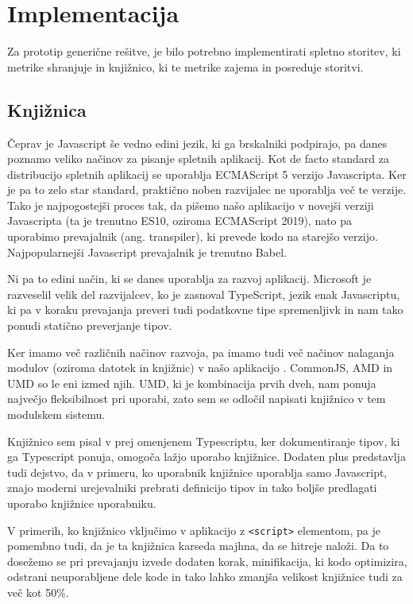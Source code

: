 \documentclass[a4paper, 12pt]{book}
\begin{document}
\section{Implementacija}
\label{ch3:sec2}

Za prototip generične rešitve, je bilo potrebno implementirati spletno storitev, ki metrike shranjuje in knjižnico, ki te metrike zajema in posreduje storitvi.

\subsection{Knjižnica}
\label{ch3:sec2:sub1}

Čeprav je Javascript še vedno edini jezik, ki ga brskalniki podpirajo, pa danes poznamo veliko načinov za pisanje spletnih aplikacij. Kot de facto standard za distribucijo spletnih aplikacij se uporablja ECMAScript 5 verzijo Javascripta. Ker je pa to zelo star standard, praktično noben razvijalec ne uporablja več te verzije. Tako je najpogostejši proces tak, da pišemo našo aplikacijo v novejši verziji Javascripta (ta je trenutno ES10, oziroma ECMAScript 2019), nato pa uporabimo prevajalnik (ang. transpiler), ki prevede kodo na starejšo verzijo. Najpopularnejši Javascript prevajalnik je trenutno Babel.

Ni pa to edini način, ki se danes uporablja za razvoj aplikacij. Microsoft je razveselil velik del razvijalcev, ko je zasnoval TypeScript, jezik enak Javascriptu, ki pa v koraku prevajanja preveri tudi podatkovne tipe spremenljivk in nam tako ponudi statično preverjanje tipov.

Ker imamo več različnih načinov razvoja, pa imamo tudi več načinov nalaganja modulov (oziroma datotek in knjižnic) v našo aplikacijo \cite{js_modules}. CommonJS, AMD in UMD so le eni izmed njih. UMD, ki je kombinacija prvih dveh, nam ponuja največjo fleksibilnost pri uporabi, zato sem se odločil napisati knjižnico v tem modulskem sistemu.

Knjižnico sem pisal v prej omenjenem Typescriptu, ker dokumentiranje tipov, ki ga Typescript ponuja, omogoča lažjo uporabo knjižnice. Dodaten plus predstavlja tudi dejstvo, da v primeru, ko  uporabnik knjižnice uporablja samo Javascript, znajo moderni urejevalniki prebrati definicijo tipov in tako boljše predlagati uporabo knjižnice uporabniku.

V primerih, ko knjižnico vključimo v aplikacijo z \verb|<script>| elementom, pa je pomembno tudi, da je ta knjižnica karseda majhna, da se hitreje naloži. Da to dosežemo se pri prevajanju izvede dodaten korak, minifikacija, ki kodo optimizira, odstrani neuporabljene dele kode in tako lahko zmanjša velikost knjižnice tudi za več kot 50\%.
\end{document}
